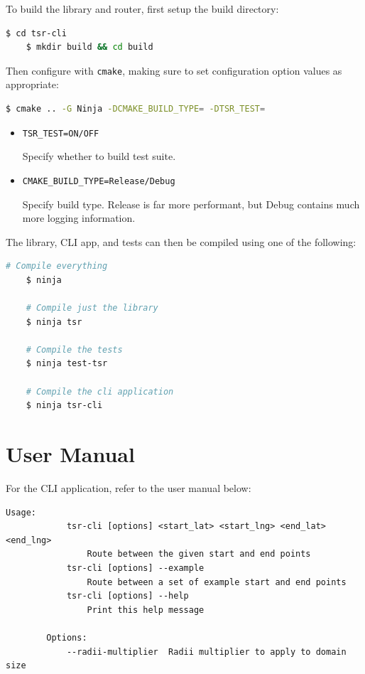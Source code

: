 \documentclass[12pt]{article}
\begin{document}
\begin{appendices}
  To build the library and router, first setup the build directory:

  \begin{lstlisting}[language=bash]
	$ cd tsr-cli
	$ mkdir build && cd build
\end{lstlisting}

  \noindent Then configure with \texttt{cmake}, making sure to set configuration option values as appropriate:

  \begin{lstlisting}[language=bash]
	$ cmake .. -G Ninja -DCMAKE_BUILD_TYPE= -DTSR_TEST=
\end{lstlisting}
  \vspace*{-2em}

  \begin{itemize}
    \item \texttt{TSR\_TEST=ON/OFF}

          Specify whether to build test suite.

    \item \texttt{CMAKE\_BUILD\_TYPE=Release/Debug}

          Specify build type. Release is far more performant, but Debug contains much more logging information.
  \end{itemize}


  \noindent The library, CLI app, and tests can then be compiled using one of the following:

  \begin{lstlisting}[language=bash]
	# Compile everything
	$ ninja

	# Compile just the library
	$ ninja tsr

	# Compile the tests
	$ ninja test-tsr

	# Compile the cli application
	$ ninja tsr-cli
\end{lstlisting}

  \pagebreak
  \section{User Manual}

  For the CLI application, refer to the user manual below:

  \begin{lstlisting}[]
	Usage: 
			tsr-cli [options] <start_lat> <start_lng> <end_lat> <end_lng>
				Route between the given start and end points
			tsr-cli [options] --example  
				Route between a set of example start and end points
			tsr-cli [options] --help
				Print this help message

		Options:
			--radii-multiplier  Radii multiplier to apply to domain size
	\end{lstlisting}

  \pagebreak
  
  

\end{appendices}
\end{document}
